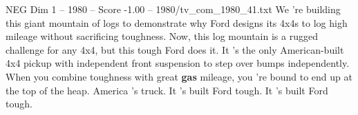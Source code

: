 \begin{textsample}{NEG Dim 1 – 1980 – Score -1.00 – 1980/tv\_com\_1980\_41.txt}  \label{ex:f1_neg_053}
We 're building this giant mountain of logs to demonstrate why Ford designs its 4x4s to log high mileage without sacrificing toughness.
Now, this log mountain is a rugged challenge for any 4x4, but this tough Ford does it.
It 's the only American-built 4x4 pickup with independent front suspension to step over bumps independently.
When you combine toughness with great \textbf{gas} mileage, you 're bound to end up at the top of the heap.
America 's truck.
It 's built Ford tough.
It 's built Ford tough.

\end{textsample}
